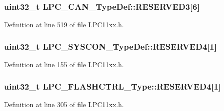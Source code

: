 \subsubsection[{\texorpdfstring{R\+E\+S\+E\+R\+V\+E\+D3}{RESERVED3}}]{\setlength{\rightskip}{0pt plus 5cm}uint32\+\_\+t L\+P\+C\+\_\+\+C\+A\+N\+\_\+\+Type\+Def\+::\+R\+E\+S\+E\+R\+V\+E\+D3\mbox{[}6\mbox{]}}\hypertarget{group___l_p_c11xx___definitions_ga92ccc3f8f6d1be742dddf974aaf93654}{}\label{group___l_p_c11xx___definitions_ga92ccc3f8f6d1be742dddf974aaf93654}


Definition at line 519 of file L\+P\+C11xx.\+h.

\subsubsection[{\texorpdfstring{R\+E\+S\+E\+R\+V\+E\+D4}{RESERVED4}}]{\setlength{\rightskip}{0pt plus 5cm}uint32\+\_\+t L\+P\+C\+\_\+\+S\+Y\+S\+C\+O\+N\+\_\+\+Type\+Def\+::\+R\+E\+S\+E\+R\+V\+E\+D4\mbox{[}1\mbox{]}}\hypertarget{group___l_p_c11xx___definitions_gadec0b128a114fba37b3501d88630acd9}{}\label{group___l_p_c11xx___definitions_gadec0b128a114fba37b3501d88630acd9}


Definition at line 155 of file L\+P\+C11xx.\+h.

\subsubsection[{\texorpdfstring{R\+E\+S\+E\+R\+V\+E\+D4}{RESERVED4}}]{ uint32\+\_\+t L\+P\+C\+\_\+\+F\+L\+A\+S\+H\+C\+T\+R\+L\+\_\+\+Type\+::\+R\+E\+S\+E\+R\+V\+E\+D4\mbox{[}1\mbox{]}}\hypertarget{group___l_p_c11xx___definitions_ga01c56664dd38ea6e92198855afc93af3}{}\label{group___l_p_c11xx___definitions_ga01c56664dd38ea6e92198855afc93af3}


Definition at line 305 of file L\+P\+C11xx.\+h.

